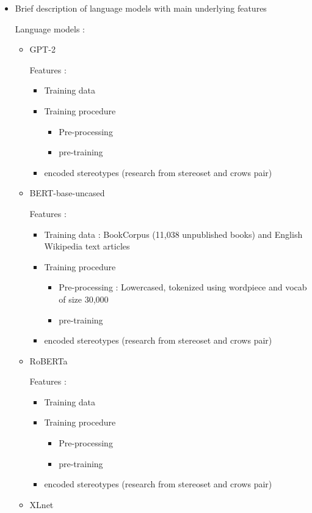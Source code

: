 \begin{itemize}
    \item Brief description of language models with main underlying features
    
    Language models :
    \begin{itemize}
        \item GPT-2 \cite{radford2019language}
        
            Features :
    \begin{itemize}
        \item Training data 
        \item Training procedure
        \begin{itemize}
            \item Pre-processing
            \item pre-training
        \end{itemize}
        \item encoded stereotypes (research from stereoset and crows pair)
    \end{itemize}
        \item BERT-base-uncased
        
            Features \cite{devlin2018bert}:
            \begin{itemize}
                \item Training data : BookCorpus (11,038 unpublished books) and English Wikipedia text articles  
                \item Training procedure
                \begin{itemize}
                    \item Pre-processing : Lowercased, tokenized using wordpiece and vocab of size 30,000
                    \item pre-training
                \end{itemize}
                \item encoded stereotypes (research from stereoset and crows pair)
    \end{itemize}
        \item RoBERTa \cite{liu2019roberta}
        
            Features :
            \begin{itemize}
                \item Training data 
                \item Training procedure
                \begin{itemize}
                    \item Pre-processing
                    \item pre-training
                \end{itemize}
                \item encoded stereotypes (research from stereoset and crows pair)
            \end{itemize}
        \item XLnet \cite{yang2019xlnet}
        

\end{itemize}
\end{itemize}
